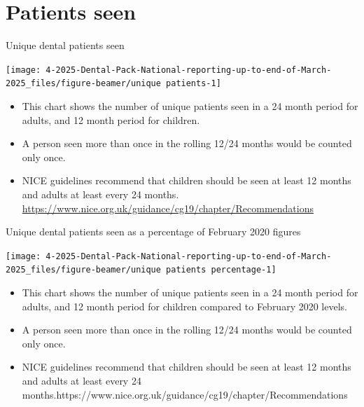 \documentclass[
  8pt,
  ignorenonframetext,
  aspectratio = 169]{beamer}
\providecommand{\tightlist}{%
  \setlength{\itemsep}{0pt}\setlength{\parskip}{0pt}}
\begin{document}
\hypertarget{patients-seen}{%
\section{Patients seen}\label{patients-seen}}

\begin{frame}{Unique dental patients seen}
\protect\hypertarget{unique-dental-patients-seen}{}
\begin{center}\texttt{[image: 4-2025-Dental-Pack-National-reporting-up-to-end-of-March-2025\_files/figure-beamer/unique patients-1]} \end{center}

\begin{itemize}
\tightlist
\item
  This chart shows the number of unique patients seen in a 24 month
  period for adults, and 12 month period for children.
\item
  A person seen more than once in the rolling 12/24 months would be
  counted only once.
\item
  NICE guidelines recommend that children should be seen at least 12
  months and adults at least every 24 months.
  \url{https://www.nice.org.uk/guidance/cg19/chapter/Recommendations}
\end{itemize}
\end{frame}

\begin{frame}{Unique dental patients seen as a percentage of February
2020 figures}
\protect\hypertarget{unique-dental-patients-seen-as-a-percentage-of-february-2020-figures}{}
\begin{center}\texttt{[image: 4-2025-Dental-Pack-National-reporting-up-to-end-of-March-2025\_files/figure-beamer/unique patients percentage-1]} \end{center}

\begin{itemize}
\tightlist
\item
  This chart shows the number of unique patients seen in a 24 month
  period for adults, and 12 month period for children compared to
  February 2020 levels.
\item
  A person seen more than once in the rolling 12/24 months would be
  counted only once.
\item
  NICE guidelines recommend that children should be seen at least 12
  months and adults at least every 24
  months.https://www.nice.org.uk/guidance/cg19/chapter/Recommendations
\end{itemize}
\end{frame}
\end{document}
